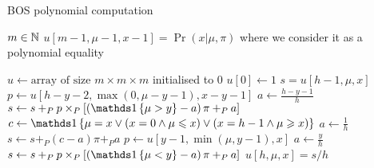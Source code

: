 \begin{algorithm}[H]
    \caption{BOS polynomial computation}
    \begin{algorithmic}[1]
    \Require $m \in \mathbb{N}$
    \Ensure $u[m -1, \mu - 1, x - 1] = \Pr(x | \mu, \pi)$ where we consider it as a polynomial equality  
        
    \State $u \leftarrow \text{array of size } m \times m \times m$ initialised to $0$
    \State $u[0] \leftarrow 1$
                \State $s = u[h - 1, \mu, x]$
                    \State $p \leftarrow u[h - y - 2, \max(0, \mu - y - 1), x - y - 1]$
                    \State $a \leftarrow \frac{h - y - 1}{h}$
                    \State $s \leftarrow s +_P p \times_P \left[ \left( \indickronecker{\mu > y} - a \right) \pi +_P a \right]$
                \EndFor
                \State $c \leftarrow \indickronecker{\mu = x \lor (x = 0 \land \mu \leq x) \lor (x = h - 1 \land \mu \geq x)}$
                \State $a \leftarrow \frac{1}{h}$
                \State $s \leftarrow s +_P (c - a) \pi +_P a$
                    \State $p \leftarrow u[y - 1, \min(\mu, y - 1), x]$
                    \State $a \leftarrow \frac{y}{h}$
                    \State $s \leftarrow s +_P p \times_P \left[ \left( \indickronecker{\mu < y} - a \right) \pi +_P  a \right]$
                \EndFor
                \State $u[h, \mu, x] = s / h$
            \EndFor
        \EndFor
    \EndFor    
\end{algorithmic}
\end{algorithm}


